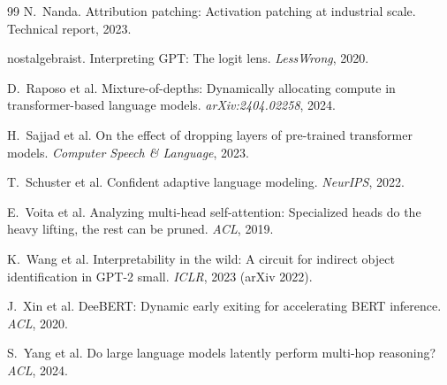 \documentclass[11pt]{article}
\begin{document}
\begin{thebibliography}{99}
N.~Nanda.
\newblock Attribution patching: Activation patching at industrial scale.
\newblock Technical report, 2023.

nostalgebraist.
\newblock Interpreting GPT: The logit lens.
\newblock \emph{LessWrong}, 2020.

D.~Raposo et al.
\newblock Mixture-of-depths: Dynamically allocating compute in
transformer-based language models.
\newblock \emph{arXiv:2404.02258}, 2024.

H.~Sajjad et al.
\newblock On the effect of dropping layers of pre-trained transformer models.
\newblock \emph{Computer Speech \& Language}, 2023.

T.~Schuster et al.
\newblock Confident adaptive language modeling.
\newblock \emph{NeurIPS}, 2022.

E.~Voita et al.
\newblock Analyzing multi-head self-attention: Specialized heads do the heavy
lifting, the rest can be pruned.
\newblock \emph{ACL}, 2019.

K.~Wang et al.
\newblock Interpretability in the wild: A circuit for indirect object
identification in GPT-2 small.
\newblock \emph{ICLR}, 2023 (arXiv 2022).

J.~Xin et al.
\newblock DeeBERT: Dynamic early exiting for accelerating BERT inference.
\newblock \emph{ACL}, 2020.

S.~Yang et al.
\newblock Do large language models latently perform multi-hop reasoning?
\newblock \emph{ACL}, 2024.

\end{thebibliography}
\end{document}

